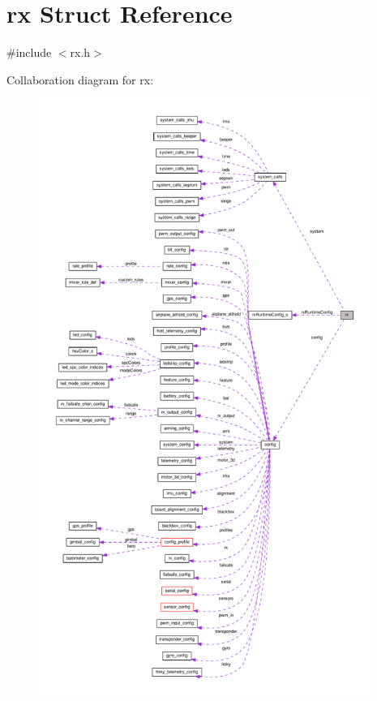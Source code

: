 \hypertarget{structrx}{\section{rx Struct Reference}
\label{structrx}
}


{\ttfamily \#include $<$rx.\+h$>$}



Collaboration diagram for rx\+:\nopagebreak
\begin{figure}[H]
\begin{center}
\leavevmode
\includegraphics[height=550pt]{structrx__coll__graph}
\end{center}
\end{figure}
